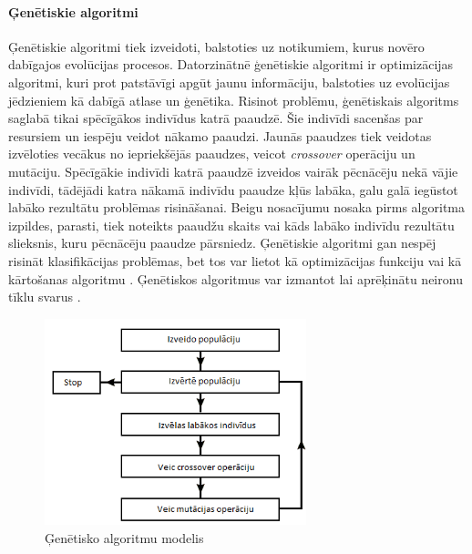 \paragraph{Ģenētiskie algoritmi}
\hfill\par
Ģenētiskie algoritmi tiek izveidoti, balstoties uz notikumiem, kurus novēro dabīgajos evolūcijas procesos. Datorzinātnē ģenētiskie algoritmi ir optimizācijas algoritmi, kuri prot patstāvīgi apgūt jaunu informāciju, balstoties uz evolūcijas jēdzieniem kā dabīgā atlase un ģenētika. Risinot problēmu, ģenētiskais algoritms saglabā tikai spēcīgākos indivīdus katrā paaudzē. Šie indivīdi sacenšas par resursiem un iespēju veidot nākamo paaudzi. Jaunās paaudzes tiek veidotas izvēloties vecākus no iepriekšējās paaudzes, veicot \textit{crossover} operāciju un mutāciju. Spēcīgākie indivīdi katrā paaudzē izveidos vairāk pēcnācēju nekā vājie indivīdi, tādējādi katra nākamā indivīdu paaudze kļūs labāka, galu galā iegūstot labāko rezultātu problēmas risināšanai. Beigu nosacījumu nosaka pirms algoritma izpildes, parasti, tiek noteikts paaudžu skaits vai kāds labāko indivīdu rezultātu slieksnis, kuru pēcnācēju paaudze pārsniedz. Ģenētiskie algoritmi gan nespēj risināt klasifikācijas problēmas, bet tos var lietot kā optimizācijas funkciju \cite{genopti} vai kā kārtošanas algoritmu \cite{deb2000fast}. Ģenētiskos algoritmus var izmantot lai aprēķinātu neironu tīklu svarus \cite{genalg}.
\begin{figure}[h]%
	\centering
	\includegraphics[height=6cm]{images/gen-algo-bilde.png} %
	\caption{Ģenētisko algoritmu modelis}%
	\label{fig:example}%
\end{figure}
